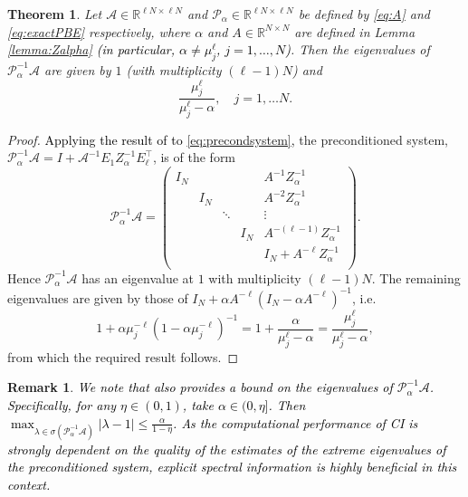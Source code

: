 \documentclass{article}
\newtheorem{rem}{Remark}
\newtheorem{thm}{Theorem}
\newcommand{\jt}{\textcolor{black}}%
\newcommand{\sizeA}{N}
\theoremstyle{definition}
\begin{document}
	\begin{thm}\label{thm:evals}
		Let $\mathcal{A} \in \mathbb{R}^{\ell N \times \ell N}$ and $\mathcal{P}_{\alpha} \in \mathbb{R}^{\ell N \times \ell N}$ be defined by \eqref{eq:A} and \eqref{eq:exactPBE} respectively, where $\alpha$ and ${A} \in \mathbb{R}^{N \times N}$ are defined in Lemma \ref{lemma:Zalpha} \jt{(in particular, $\alpha \ne \mu_j^\ell$, $j = 1,\dots,\sizeA$)}. 
		Then the eigenvalues of $\mathcal{P}_{\alpha}^{-1} \mathcal{A}$ are given by $1$ (with multiplicity $(\ell-1) \sizeA$) and 
		\begin{equation*}
			\frac{\mu_j^{\ell}}{\mu_j^{{\ell}} - \alpha}, \quad j = 1, \dots \sizeA.
		\end{equation*}
	\end{thm}
	
	\begin{proof}
		\jt{Applying the result of \cite[Theorem 3.2]{LinNgalphacirculant2021} to \eqref{eq:precondsystem},} the preconditioned system, $ \mathcal{P}_\alpha^{-1}\mathcal{A} = I +\mathcal{A}^{-1}E_1Z_\alpha^{-1}E_\ell^{\top} $, is of the form
		$$\mathcal{P}_\alpha^{-1}\mathcal{A} = \begin{pmatrix}
			I_\sizeA &&&& A^{-1}{Z}_\alpha^{-1}\\
			& I_\sizeA &&& A^{-2}{Z}_\alpha^{-1}\\
			&&\ddots &&\vdots\\
			&&& I_\sizeA & A^{-(\ell-1)}{Z}_\alpha^{-1}\\
			&&&& I_\sizeA+A^{-\ell}{Z}_\alpha^{-1}\\
		\end{pmatrix}.$$ Hence
		$\mathcal{P}_{\alpha}^{-1}\mathcal{A}$ has an eigenvalue at $1$ with multiplicity $(\ell-1) \sizeA$. The remaining eigenvalues are given by those of $I_\sizeA+\alpha{A}^{-\ell} (I_\sizeA-\alpha{A}^{-\ell})^{-1}$, i.e.
		\begin{equation*}
			1 +\alpha  \mu_j^{-\ell}\left(1 - \alpha \mu_j^{-\ell} \right)^{-1} = 1 +\frac{\alpha}{\mu_j^{{\ell}} - \alpha} = \frac{\mu_j^{{\ell}}}{\mu_j^{\ell} - \alpha},
		\end{equation*}
		from which the required result follows.    
	\end{proof}
	
	
	\begin{rem}
		\jt{We note that \cite[Theorem 3.2]{LinNgalphacirculant2021} also provides a bound on the eigenvalues of $\mathcal{P}_{\alpha}^{-1}\mathcal{A}$. Specifically, for any $\eta \in (0,1)$, take $\alpha \in (0,\eta]$. Then $\max_{\lambda \in \sigma(\mathcal{P}_\alpha^{-1}\mathcal{A})}|\lambda-1|\le \frac{\alpha}{1-\eta}$. 
			As the computational performance of CI is strongly dependent on the quality of the estimates of the extreme eigenvalues of the preconditioned system,  explicit spectral information is highly beneficial in this context.} 
	\end{rem}
	
\end{document}
